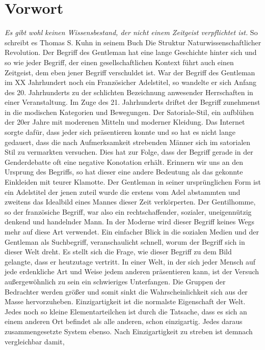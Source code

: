 \chapter{Vorwort}
\textit{\glqq Es gibt wohl keinen Wissensbestand, der nicht einem Zeitgeist verpflichtet ist.\grqq} 
So schreibt es Thomas S. Kuhn in seinem Buch \glqq Die Struktur Naturwissenschaftlicher Revolution.\grqq
Der Begriff des Gentleman hat eine lange Geschichte hinter sich und so wie jeder Begriff, der einen
gesellschaftlichen Kontext führt auch einen Zeitgeist, dem eben jener Begriff verschuldet ist.
War der Begriff des Gentleman im XX Jahrhundert noch ein Französicher Adelstitel, so wandelte er sich Anfang des
20. Jahrhunderts zu der schlichten Bezeichnung anwesender Herrschaften in einer Veranstaltung. Im Zuge
des 21. Jahrhunderts driftet der Begriff zunehmenst in die modischen Kategorien und Bewegungen.
Der Satoriale-Stil, ein aufblühen der 20er Jahre mit moderenen Mitteln und moderner Kleidung.
Das Internet sorgte dafür, dass jeder sich präsentieren konnte und so hat es nicht lange gedauert, dass
die nach Aufmerksamkeit strebenden Männer sich im satorialen Stil zu vermarkten versuchen. Dies hat zur Folge,
dass der Begriff gerade in der Genderdebatte oft eine negative Konotation erhält. Erinnern wir uns an den Ursprung des
Begriffs, so hat dieser eine andere Bedeutung als das gekonnte Einkleiden mit teurer Klamotte.
Der Gentleman in seiner ursprünglichen Form ist ein Adelstitel der jenen zuteil wurde die erstens vom
Adel abstammten und zweitens das Idealbild eines Mannes dieser Zeit verkörperten. Der Gentilhomme, so der
französiche Begriff, war also ein rechtschaffender, sozialer, uneigennützig denkend und handelnder Mann.
In der Moderne wird dieser Begriff keines Wegs mehr auf diese Art verwendet. Ein einfacher Blick in die
\glqq sozialen \grqq Medien und der Gentleman als Suchbegriff, veranschaulicht schnell, worum der Begriff sich
in dieser Welt dreht. Es stellt sich die Frage, wie dieser Begriff zu dem Bild gelangte, dass er heutzutage vertritt.
In einer Welt, in der sich jeder Mensch auf jede erdenkliche Art und Weise jedem anderen präsentieren kann, ist
der Versuch außergewöhnlich zu sein ein schwieriges Unterfangen. Die Gruppen der Bedrachter werden größer und somit
sinkt die Wahrscheinlichkeit sich aus der Masse hervorzuheben. Einzigartigkeit ist die normalste Eigenschaft der Welt.
Jedes noch so kleine Elementarteilchen ist durch die Tatsache, dass es sich an einem anderen Ort befindet als alle anderen,
schon einzigartig. Jedes daraus zusammengesetzte System ebenso. Nach Einzigartigkeit zu streben ist demnach vergleichbar damit,
